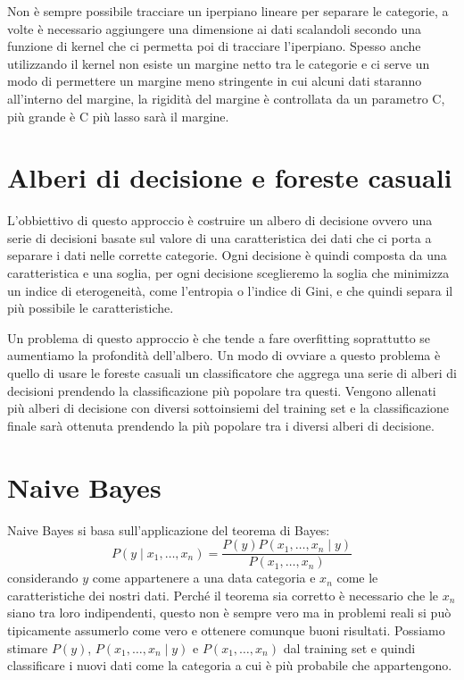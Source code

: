 \documentclass[a4paper,12pt]{report}
\begin{document}
Non è sempre possibile tracciare un iperpiano lineare per separare le categorie,
a volte è necessario aggiungere una dimensione ai dati scalandoli secondo una
funzione di kernel che ci permetta poi di tracciare l'iperpiano. Spesso anche
utilizzando il kernel non esiste un margine netto tra le categorie e ci serve un
modo di permettere un margine meno stringente in cui alcuni dati staranno
all'interno del margine, la rigidità del margine è controllata da un parametro
C, più grande è C più lasso sarà il margine.

\section{Alberi di decisione e foreste casuali}

L'obbiettivo di questo approccio è costruire un albero di decisione ovvero una
serie di decisioni basate sul valore di una caratteristica dei dati che ci porta
a separare i dati nelle corrette categorie. Ogni decisione è quindi composta da
una caratteristica e una soglia, per ogni decisione sceglieremo la soglia che
minimizza un indice di eterogeneità, come l'entropia o l'indice di Gini, e che
quindi separa il più possibile le caratteristiche.

Un problema di questo approccio è che tende a fare overfitting soprattutto se
aumentiamo la profondità dell'albero. Un modo di ovviare a questo problema è
quello di usare le foreste casuali un classificatore che aggrega una serie di
alberi di decisioni prendendo la classificazione più popolare tra questi.
Vengono allenati più alberi di decisione con diversi sottoinsiemi del training
set e la classificazione finale sarà ottenuta prendendo la più popolare tra i
diversi alberi di decisione.

\section{Naive Bayes}

Naive Bayes si basa sull'applicazione del teorema di Bayes:
$$
P(y \mid x_1, \dots, x_n) = \frac{P(y) P(x_1, \dots, x_n \mid y)}
                                 {P(x_1, \dots, x_n)}
$$
considerando $y$ come appartenere a una data categoria e $x_n$ come le
caratteristiche dei nostri dati. Perché il teorema sia corretto è necessario che
le $x_n$ siano tra loro indipendenti, questo non è sempre vero ma in problemi
reali si può tipicamente assumerlo come vero e ottenere comunque buoni
risultati. Possiamo stimare $P(y)$, $P(x_1, \dots, x_n \mid y)$ e
$P(x_1, \dots, x_n)$ dal training set e quindi classificare i nuovi dati come la
categoria a cui è più probabile che appartengono.
\end{document}
